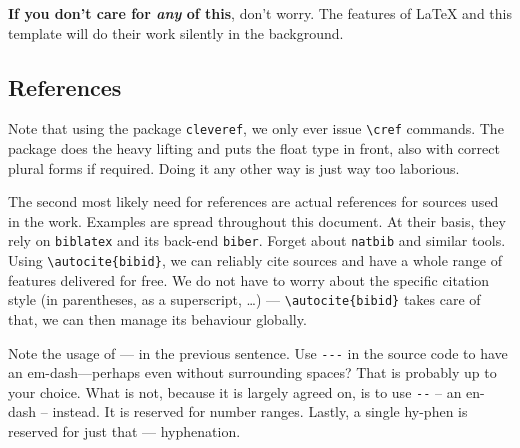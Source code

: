 \lipsum

\textbf{If you don't care for \textit{any} of this}, don't worry.
The features of \LaTeX{} and this template will do their work silently in the background.
\subsection{References}
Note that using the package \texttt{cleveref}, we only ever issue \verb|\cref| commands.
The package does the heavy lifting and puts the float type in front, also with correct plural forms if required.
Doing it any other way is just way too laborious.

The second most likely need for references are actual references for sources used in the work.
Examples are spread throughout this document.
At their basis, they rely on \texttt{biblatex} and its back-end \texttt{biber}.
Forget about \texttt{natbib} and similar tools.
Using \verb|\autocite{bibid}|, we can reliably cite sources and have a whole range of features delivered for free.
We do not have to worry about the specific citation style (in parentheses, as a superscript, \dots) --- \verb|\autocite{bibid}| takes care of that, we can then manage its behaviour globally.

Note the usage of --- in the previous sentence.
Use \verb|---| in the source code to have an em-dash---perhaps even without surrounding spaces?
That is probably up to your choice.
What is not, because it is largely agreed on, is to use \verb|--| -- an en-dash -- instead.
It is reserved for number ranges.
Lastly, a single hy-phen is reserved for just that --- hyphenation.

